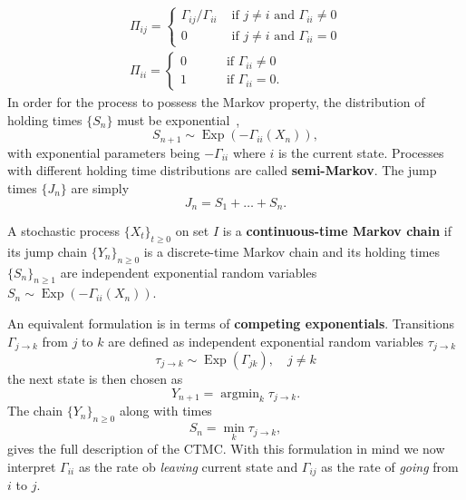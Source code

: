 \begin{equation}
	\begin{array}{l}
		\Pi_{i j}=\left\{
		\begin{array}{ll}
			\Gamma_{i j} / \Gamma_{ii} & \text { if } j \neq i \text { and } \Gamma_{ii} \neq 0 \\
			 0 & \text { if } j \neq i \text { and } \Gamma_{ii}=0
		\end{array}\right. 
		\\ 
		\Pi_{i i}=\left\{
		\begin{array}{ll}
			0 & \qquad  \text { if } \Gamma_{ii} \neq 0 \\
			1 & \qquad \text { if } \Gamma_{ii}=0.
		\end{array}\right.
	\end{array}
\end{equation}
In order for the process to possess the Markov property, the distribution of holding times $\{S_n\}$ must be exponential~\cite{norris1998markov}, 
\begin{equation}
	S_{n+1} \sim \operatorname{Exp}(-{\Gamma_{ii}}(X_n)),
\end{equation}
with exponential parameters being $-\Gamma_{ii}$ where $i$ is the current state.
Processes with different holding time distributions are called \textbf{semi-Markov}. The jump times $\{J_n\}$ are simply 
\begin{equation}
	J_{n}=S_{1}+\ldots+S_{n}.
\end{equation}
\begin{definition}
	A stochastic process $\{X_t\}_{t \geq 0}$ on set $I$ is a \textbf{continuous-time Markov chain} if its jump chain $\{Y_n\}_{n \geq 0}$ is a discrete-time Markov chain and its holding times $\{S_n\}_{n \geq 1}$ are independent exponential random variables $S_n \sim \operatorname{Exp}(-{\Gamma_{ii}}(X_n))$.
\end{definition}
An equivalent formulation is in terms of \textbf{competing exponentials}. Transitions $\Gamma_{j \rightarrow k}$ from $j$ to $k$ are defined as independent exponential random variables $\tau_{j \rightarrow k}$
\begin{equation}
	\tau_{j \rightarrow k} \sim \operatorname{Exp}(\Gamma_{jk}), \quad j \neq k
\end{equation}
the next state is then chosen as
\begin{equation}
	Y_{n+1} = \operatorname{argmin}_{k} \tau_{j \rightarrow k}.
\end{equation}
The chain $\{Y_n\}_{n\geq0}$ along with times 
\begin{equation}
	S_{n} = \min _{k} \tau_{j \rightarrow k},
\end{equation}
gives the full description of the CTMC. With this formulation in mind we now interpret $\Gamma_{ii}$ as the rate ob \emph{leaving} current state and $\Gamma_{i j}$ as the rate of \emph{going} from $i$ to $j$.

